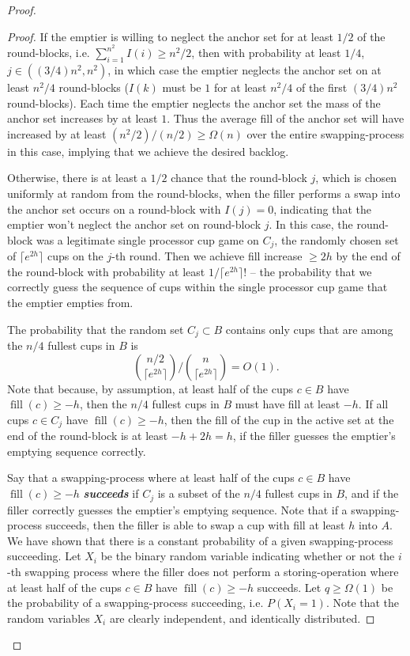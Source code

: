 \documentclass[twocolumn]{article}[10pt]
\newcommand{\defn}[1]{{\textit{\textbf{\boldmath #1}}}\xspace}
\DeclareMathOperator{\fil}{\text{fill}}
\begin{document}
\begin{proof}
\begin{proof}
  If the emptier is willing to neglect the anchor set for at least $1/2$ of the
  round-blocks, i.e. $\sum_{i=1}^{n^2} I(i) \ge n^2 / 2$, then with probability
  at least $1/4$, $j \in ((3/4) n^2, n^2)$, in which case the emptier neglects
  the anchor set on at least $n^2/4$ round-blocks ($I(k)$ must be $1$ for at
  least $n^2/4$ of the first $(3/4)n^2$ round-blocks). Each time the emptier
  neglects the anchor set the mass of the anchor set increases by at least $1$.
  Thus the average fill of the anchor set will have increased by at least
  $(n^2/2)/(n/2) \ge \Omega(n)$ over the entire swapping-process in this
  case, implying that we achieve the desired backlog. 

  Otherwise, there is at least a $1/2$ chance that the round-block $j$, which
  is chosen uniformly at random from the round-blocks, when the filler performs
  a swap into the anchor set occurs on a round-block with $I(j)=0$, indicating
  that the emptier won't neglect the anchor set on round-block $j$. In this
  case, the round-block was a legitimate single processor cup game on $C_j$,
  the randomly chosen set of $\lceil e^{2h} \rceil$ cups on the $j$-th round.
  Then we achieve fill increase $\ge 2h$ by the end of the round-block with
  probability at least $1/\lceil e^{2h}\rceil!$ -- the probability that we
  correctly guess the sequence of cups within the single processor cup game
  that the emptier empties from. 

  The probability that the random set $C_j \subset B$ contains only cups that
  are among the $n/4$ fullest cups in $B$ is $${n/2 \choose {\lceil e^{2h}
  \rceil}} / {n \choose {\lceil e^{2h}\rceil}} = O(1).$$ Note that because, by
  assumption, at least half of the cups $c \in B$ have $\fil(c) \ge -h$, then
  the $n/4$ fullest cups in $B$ must have fill at least $-h$. If all cups $
  c\in C_j$ have $\fil(c) \ge -h$, then the fill of the cup in the active set
  at the end of the round-block is at least $-h + 2h = h$, if the filler
  guesses the emptier's emptying sequence correctly.

  Say that a swapping-process where at least half of the cups $c\in B$ have
  $\fil(c) \ge -h$ \defn{succeeds} if $C_j$ is a subset of the $n/4$ fullest
  cups in $B$, and if the filler correctly guesses the emptier's emptying
  sequence. Note that if a swapping-process succeeds, then the filler is able
  to swap a cup with fill at least $h$ into $A$. We have shown that there is a
  constant probability of a given swapping-process succeeding. Let $X_i$ be the
  binary random variable indicating whether or not the $i$-th swapping process
  where the filler does not perform a storing-operation where at least half of
  the cups $c\in B$ have $\fil(c) \ge -h$ succeeds. Let $q \ge \Omega(1)$ be
  the probability of a swapping-process succeeding, i.e. $P(X_i=1)$. Note that
  the random variables $X_i$ are clearly independent, and identically
  distributed.


\end{proof}
\end{proof}
\end{document}
